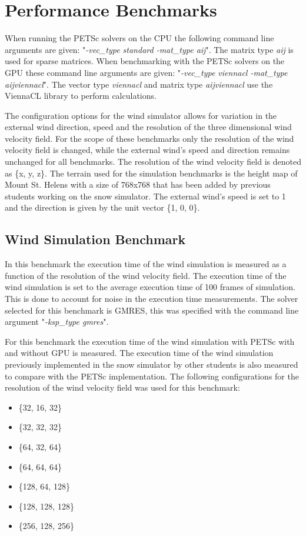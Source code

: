 \section{Performance Benchmarks}

When running the PETSc solvers on the CPU the following command line arguments
are given: "\emph{-vec\_type standard -mat\_type aij}". The matrix type
\emph{aij} is used for sparse matrices. When benchmarking with the PETSc solvers
on the GPU these command line arguments are given: "\emph{-vec\_type viennacl
-mat\_type aijviennacl}". The vector type \emph{viennacl} and matrix type
\emph{aijviennacl} use the ViennaCL library to perform calculations.

The configuration options for the wind simulator allows for variation in the
external wind direction, speed and the resolution of the three dimensional wind
velocity field. For the scope of these benchmarks only the resolution of the wind
velocity field is changed, while the external wind's speed and direction remains
unchanged for all benchmarks. The resolution of the wind velocity field is denoted
as \{x, y, z\}. The terrain used for the simulation benchmarks is the height map of
Mount St. Helens with a size of 768x768 that has been added by previous students
working on the snow simulator. The external wind's speed is set to 1 and the
direction is given by the unit vector \{1, 0, 0\}.

\subsection{Wind Simulation Benchmark}

In this benchmark the execution time of the wind simulation is measured as a
function of the resolution of the wind velocity field. The execution time of
the wind simulation is set to the average execution time of 100 frames of
simulation. This is done to account for noise in the execution time measurements.
The solver selected for this benchmark is GMRES, this was specified with the
command line argument "\emph{-ksp\_type gmres}".

For this benchmark the execution time of the wind simulation with PETSc with and
without GPU is measured. The execution time of the wind simulation previously
implemented in the snow simulator by other students is also measured to compare
with the PETSc implementation. The following configurations for the resolution of
the wind velocity field was used for this benchmark:

\begin{itemize}
	\item \{32, 16, 32\}
	\item \{32, 32, 32\}
	\item \{64, 32, 64\}
	\item \{64, 64, 64\}
	\item \{128, 64, 128\}
	\item \{128, 128, 128\}
	\item \{256, 128, 256\}
\end{itemize}


